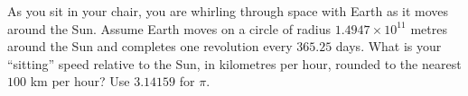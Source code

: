 As you sit in your chair, you are whirling through space with Earth as it moves around the Sun. Assume Earth moves on a circle of radius $1.4947\times10^{11}$ metres around the Sun and completes one revolution every $365.25$ days. What is your ``sitting'' speed relative to the Sun, in kilometres per hour, rounded to the nearest $100$ km per hour? Use $3.14159$ for $\pi$.
